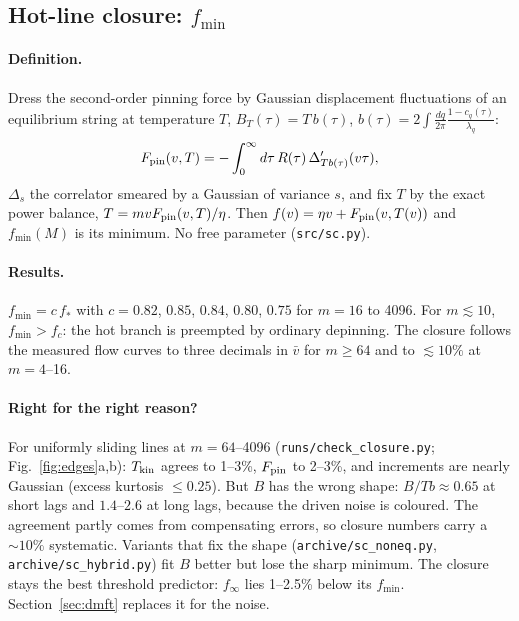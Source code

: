 \documentclass[10pt,a4paper]{article}
\newcommand{\fcs}{f_c}
\begin{document}
\subsection{Hot-line closure: $f_{\min}$}
\label{sec:closure}

\paragraph{Definition.} Dress the second-order pinning force by Gaussian displacement fluctuations of an equilibrium string at temperature $T$, $B_T(\tau)=T\,b(\tau)$, $b(\tau)=2\int\frac{dq}{2\pi}\frac{1-c_q(\tau)}{\lambda_q}$:
\begin{equation}
F_{\rm pin}(v,T)=-\int_0^\infty d\tau\,R(\tau)\,\Delta'_{Tb(\tau)}(v\tau),
\label{eq:Fpin}
\end{equation}
$\Delta_s$ the correlator smeared by a Gaussian of variance $s$, and fix $T$ by the exact power balance, $T=mvF_{\rm pin}(v,T)/\eta$. Then $f(v)=\eta v+F_{\rm pin}(v,T(v))$ and $f_{\min}(M)$ is its minimum. No free parameter (\texttt{src/sc.py}).

\paragraph{Results.} $f_{\min}=c\,f_*$ with $c=0.82$, $0.85$, $0.84$, $0.80$, $0.75$ for $m=16$ to 4096. For $m\lesssim10$, $f_{\min}>\fcs$: the hot branch is preempted by ordinary depinning. The closure follows the measured flow curves to three decimals in $\bar v$ for $m\ge64$ and to $\lesssim10\%$ at $m=4$--16.

\paragraph{Right for the right reason?} For uniformly sliding lines at $m=64$--4096 (\texttt{runs/check\_closure.py}; Fig.~\ref{fig:edges}a,b): $T_{\rm kin}$ agrees to 1--3\%, $F_{\rm pin}$ to 2--3\%, and increments are nearly Gaussian (excess kurtosis $\le0.25$). But $B$ has the wrong shape: $B/Tb\approx0.65$ at short lags and $1.4$--$2.6$ at long lags, because the driven noise is coloured. The agreement partly comes from compensating errors, so closure numbers carry a $\sim10\%$ systematic. Variants that fix the shape (\texttt{archive/sc\_noneq.py}, \texttt{archive/sc\_hybrid.py}) fit $B$ better but lose the sharp minimum. The closure stays the best threshold predictor: $f_\infty$ lies 1--2.5\% below its $f_{\min}$. Section~\ref{sec:dmft} replaces it for the noise.
\end{document}
